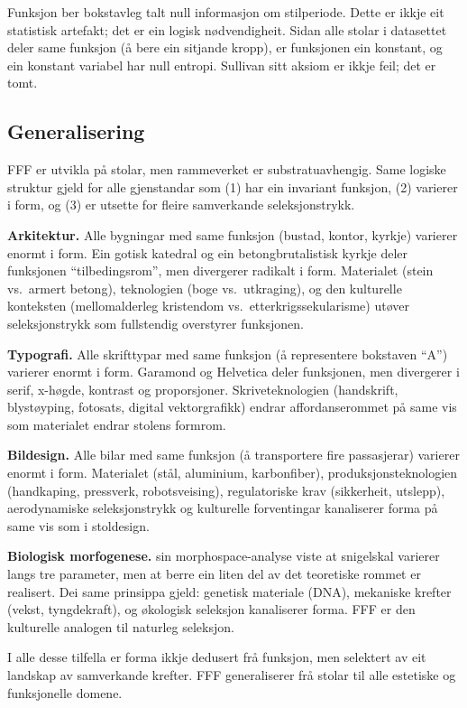 \documentclass[10pt, a4paper, twocolumn]{article}
\begin{document}
Funksjon ber bokstavleg talt null informasjon om stilperiode. Dette er ikkje eit statistisk artefakt; det er ein logisk nødvendigheit. Sidan alle stolar i datasettet deler same funksjon (å bere ein sitjande kropp), er funksjonen ein konstant, og ein konstant variabel har null entropi. Sullivan sitt aksiom er ikkje feil; det er tomt.

\subsection{Generalisering}

FFF er utvikla på stolar, men rammeverket er substratuavhengig. Same logiske struktur gjeld for alle gjenstandar som (1) har ein invariant funksjon, (2) varierer i form, og (3) er utsette for fleire samverkande seleksjonstrykk.

\textbf{Arkitektur.} Alle bygningar med same funksjon (bustad, kontor, kyrkje) varierer enormt i form. Ein gotisk katedral og ein betongbrutalistisk kyrkje deler funksjonen ``tilbedingsrom'', men divergerer radikalt i form. Materialet (stein vs.\ armert betong), teknologien (boge vs.\ utkraging), og den kulturelle konteksten (mellomalderleg kristendom vs.\ etterkrigssekularisme) utøver seleksjonstrykk som fullstendig overstyrer funksjonen.

\textbf{Typografi.} Alle skrifttypar med same funksjon (å representere bokstaven ``A'') varierer enormt i form. Garamond og Helvetica deler funksjonen, men divergerer i serif, x-høgde, kontrast og proporsjoner. Skriveteknologien (handskrift, blystøyping, fotosats, digital vektorgrafikk) endrar affordanserommet på same vis som materialet endrar stolens formrom.

\textbf{Bildesign.} Alle bilar med same funksjon (å transportere fire passasjerar) varierer enormt i form. Materialet (stål, aluminium, karbonfiber), produksjonsteknologien (handkaping, pressverk, robotsveising), regulatoriske krav (sikkerheit, utslepp), aerodynamiske seleksjonstrykk og kulturelle forventingar kanaliserer forma på same vis som i stoldesign.

\textbf{Biologisk morfogenese.} \citet{raup1966} sin morphospace-analyse viste at snigelskal varierer langs tre parameter, men at berre ein liten del av det teoretiske rommet er realisert. Dei same prinsippa gjeld: genetisk materiale (DNA), mekaniske krefter (vekst, tyngdekraft), og økologisk seleksjon kanaliserer forma. FFF er den kulturelle analogen til naturleg seleksjon.

I alle desse tilfella er forma ikkje dedusert frå funksjon, men selektert av eit landskap av samverkande krefter. FFF generaliserer frå stolar til alle estetiske og funksjonelle domene.
\end{document}
